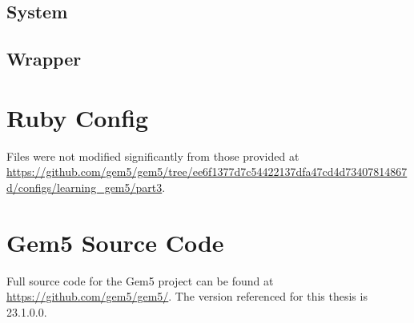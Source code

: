 \documentclass[12pt,twoside]{reedthesis}
\newcommand{\vstep}{\vspace{5mm}}
\begin{document}
\subsection*{System}

\vstep

\subsection*{Wrapper}

\vstep

\section{Ruby Config}

Files were not modified significantly from those provided at \url{https://github.com/gem5/gem5/tree/ee6f1377d7c54422137dfa47cd4d73407814867d/configs/learning_gem5/part3}.

\section{Gem5 Source Code}

Full source code for the Gem5 project can be found at \url{https://github.com/gem5/gem5/}. The version referenced for this thesis is 23.1.0.0.

\nocite{*}
\printbibliography[title=References]
\end{document}
